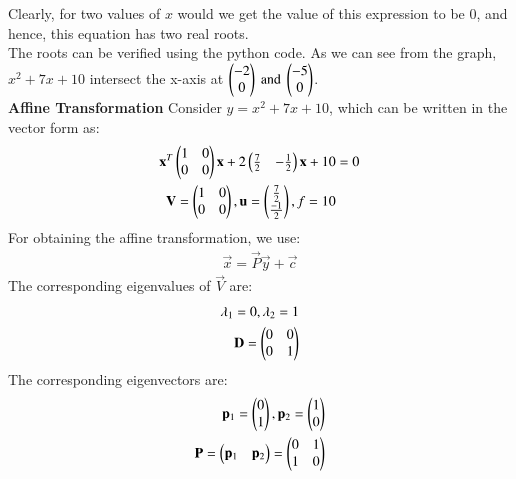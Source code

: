 \documentclass[journal,12pt,twocolumn]{IEEEtran}
\begin{document}
Clearly, for two values of $x$ would we get the value of this expression to be $0$, and hence, this equation has two real roots.\\
The roots can be verified using the python code. As we can see from the graph, $x^2+7x+10$ intersect the x-axis at ${\begin{pmatrix}-2\\0\end{pmatrix}\text{ and }\begin{pmatrix}-5\\0\end{pmatrix}}$.\\
\textbf{Affine Transformation}
Consider $y = x^2+7x+10$, which can be written in the vector form as:
\begin{align}
\mathbf{x}^T\begin{pmatrix}1 & 0 \\ 0 & 0\end{pmatrix}\mathbf{x} + 2\begin{pmatrix}\frac{7}{2} & -\frac{1}{2}\end{pmatrix}\mathbf{x} + 10 &= 0 \\
\mathbf{V} = \begin{pmatrix}1 & 0\\0 & 0\end{pmatrix} , \mathbf{u} = \begin{pmatrix}\frac{7}{2}\\ \frac{-1}{2}\end{pmatrix} , f = 10
\end{align}
For obtaining the affine transformation, we use:
\begin{align}
    \vec{x} = \vec{P}\vec{y} + \vec{c}
\end{align}
The corresponding eigenvalues of $\vec{V}$ are:
\begin{align}
    \lambda_1 = 0 , \lambda_2 = 1\\
    \mathbf{D} = \begin{pmatrix}0 & 0\\0 & 1\end{pmatrix}
\end{align}
The corresponding eigenvectors are:
\begin{align}
    \mathbf{p}_1 = \begin{pmatrix}0\\1\end{pmatrix} , \mathbf{p}_2 = \begin{pmatrix}1\\0\end{pmatrix}\\
    \mathbf{P} = \begin{pmatrix}\mathbf{p}_1 & \mathbf{p}_2\end{pmatrix} = \begin{pmatrix}0 & 1\\1 & 0\end{pmatrix}
\end{align}
\end{document}
